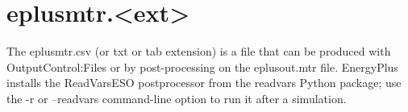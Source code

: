 \section{eplusmtr.\textless{}ext\textgreater{}}\label{eplusmtr.ext}

The eplusmtr.csv (or txt or tab extension) is a file that can be produced with OutputControl:Files or by post-processing on the eplusout.mtr file. EnergyPlus installs the ReadVarsESO postprocessor from the readvars Python package; use the -r or --readvars command-line option to run it after a simulation.
